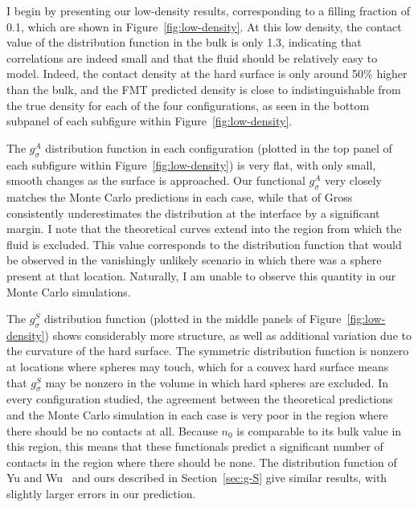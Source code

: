 I begin by presenting our low-density results, corresponding to a
filling fraction of 0.1, which are shown in
Figure~\ref{fig:low-density}.  At this low density,
the contact value of the distribution function in the bulk is only 1.3,
indicating that correlations are indeed small and that the fluid should be
relatively easy to model.  Indeed, the contact density at the hard
surface is only around 50\% higher than the bulk, and the FMT
predicted density is close to indistinguishable from the true
density for each of the four configurations, as seen in the bottom
subpanel of each subfigure within Figure~\ref{fig:low-density}.

The $g_\sigma^A$ distribution function in each configuration (plotted
in the top panel of each subfigure within Figure~\ref{fig:low-density}) is
very flat, with only small, smooth changes as the surface is approached.
Our functional $g_\sigma^A$ very closely matches the Monte Carlo
predictions in each case, while that of Gross consistently
underestimates the distribution at the interface by a significant margin.  I note that the theoretical curves
extend into the region from which the fluid is excluded.  This value
corresponds to the distribution function that would be observed in the
vanishingly unlikely scenario in which there was a sphere present at
that location.  Naturally, I am unable to observe this quantity in
our Monte Carlo simulations.

The $g_\sigma^S$ distribution function (plotted
in the middle panels of Figure~\ref{fig:low-density}) shows considerably more
structure, as well as additional variation due to the curvature of the
hard surface.  The symmetric distribution function is nonzero at
locations where spheres may touch, which for a convex hard surface
means that $g_\sigma^S$ may be nonzero in the volume in which hard
spheres are excluded.  In every configuration studied, the agreement
between the theoretical predictions and the Monte Carlo simulation in
each case is very poor in the region where there should be no contacts
at all.  Because $n_0$ is comparable to its bulk value in this region,
this means that these functionals predict a significant number of
contacts in the region where there should be none.  The distribution
function of Yu and Wu~\cite{yu2002fmt-dft-inhomogeneous-associating}
and ours described in Section~\ref{sec:g-S} give similar results, with
slightly larger errors in our prediction.

